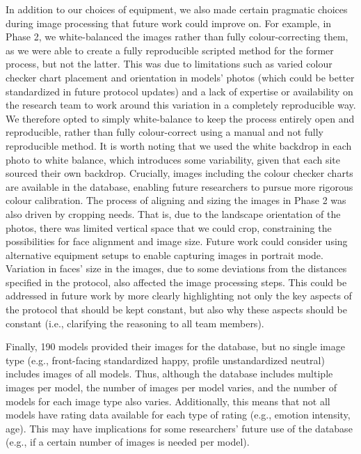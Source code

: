 \documentclass[
  letterpaper,
  DIV=11,
  numbers=noendperiod]{scrartcl}
\begin{document}
In addition to our choices of equipment, we also made certain pragmatic
choices during image processing that future work could improve on. For
example, in Phase 2, we white-balanced the images rather than fully
colour-correcting them, as we were able to create a fully reproducible
scripted method for the former process, but not the latter. This was due
to limitations such as varied colour checker chart placement and
orientation in models' photos (which could be better standardized in
future protocol updates) and a lack of expertise or availability on the
research team to work around this variation in a completely reproducible
way. We therefore opted to simply white-balance to keep the process
entirely open and reproducible, rather than fully colour-correct using a
manual and not fully reproducible method. It is worth noting that we
used the white backdrop in each photo to white balance, which introduces
some variability, given that each site sourced their own backdrop.
Crucially, images including the colour checker charts are available in
the database, enabling future researchers to pursue more rigorous colour
calibration. The process of aligning and sizing the images in Phase 2
was also driven by cropping needs. That is, due to the landscape
orientation of the photos, there was limited vertical space that we
could crop, constraining the possibilities for face alignment and image
size. Future work could consider using alternative equipment setups to
enable capturing images in portrait mode. Variation in faces' size in
the images, due to some deviations from the distances specified in the
protocol, also affected the image processing steps. This could be
addressed in future work by more clearly highlighting not only the key
aspects of the protocol that should be kept constant, but also why these
aspects should be constant (i.e., clarifying the reasoning to all team
members).

Finally, 190 models provided their images for the database, but no
single image type (e.g., front-facing standardized happy, profile
unstandardized neutral) includes images of all models. Thus, although
the database includes multiple images per model, the number of images
per model varies, and the number of models for each image type also
varies. Additionally, this means that not all models have rating data
available for each type of rating (e.g., emotion intensity, age). This
may have implications for some researchers' future use of the database
(e.g., if a certain number of images is needed per model).
\end{document}
